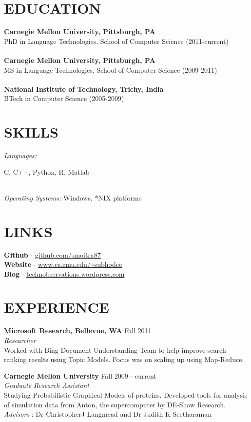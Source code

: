 \documentclass[margin]{res}
\begin{document}
\begin{resume}
 
\section{EDUCATION}\textbf{Carnegie Mellon University, Pittsburgh, PA} \\
					PhD in Language Technologies, School of Computer Science (2011-current) \\
					\\					
  \textbf{Carnegie Mellon University, Pittsburgh, PA} \\
					MS in Language Technologies, School of Computer Science (2009-2011) \\
					\\					
 					\textbf{National Institute of Technology, Trichy, India} \\
					BTech in Computer Science (2005-2009) 		


\section{SKILLS} {\sl Languages:}  \parbox[position=center]{4.5in}{C, C++, Python, R, Matlab}\\
                {\sl Operating Systems:} Windows, *NIX platforms

\section{LINKS} \textbf{Github} - \url{github.com/smoitra87}\\
		  \textbf{Website} - \url{www.cs.cmu.edu/~subhodee}\\
		\textbf{Blog} - \url{technobservations.wordpress.com}
  
\section{EXPERIENCE} 
               {\textbf{Microsoft Research, Bellevue, WA } } \hfill Fall 2011 \\
                {\sl Researcher } \\
		Worked with Bing Document Understanding Team to help improve search ranking results using Topic Models. Focus was on scaling up using Map-Reduce.


	{\textbf{Carnegie Mellon University} } \hfill Fall 2009 - current \\
                {\sl Graduate Research Assistant } \\
	Studying Probabilistic Graphical Models of proteins.  Developed tools for analysis of simulation data from Anton, the supercomputer by DE-Shaw Research. \\
                {\sl Advisors} : Dr ChristopherJ Langmead and Dr Judith K-Seetharaman 


\end{resume}
\end{document}
